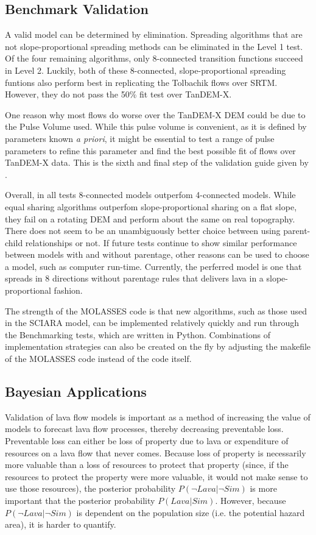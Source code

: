 \documentclass[12pt,letter]{article}
\begin{document}
	\subsection{Benchmark Validation}
	A valid model can be determined by elimination. Spreading algorithms that are not slope-proportional spreading methods can be eliminated in the Level 1 test. Of the four remaining algorithms, only 8-connected transition functions succeed in Level 2. Luckily, both of these 8-connected, slope-proportional spreading funtions also perform best in replicating the Tolbachik flows over SRTM. However, they do not pass the 50\% fit test over TanDEM-X.
	
	One reason why most flows do worse over the TanDEM-X DEM could be due to the Pulse Volume used. While this pulse volume is convenient, as it is defined by parameters known \textit{a priori}, it might be essential to test a range of pulse parameters to refine this parameter and find the best possible fit of flows over TanDEM-X data. This is the sixth and final step of the validation guide given by \citet{bayarri2007framework}.
	
	Overall, in all tests 8-connected models outperfom 4-connected models. While equal sharing algorithms outperfom slope-proportional sharing on a flat slope, they fail on a rotating DEM and perform about the same on real topography. There does not seem to be an unambiguously better choice between using parent-child relationships or not. If future tests continue to show similar performance between models with and without parentage, other reasons can be used to choose a model, such as computer run-time. Currently, the perferred model is one that spreads in 8 directions without parentage rules that delivers lava in a slope-proportional fashion.
	
	The strength of the MOLASSES code is that new algorithms, such as those used in the SCIARA model, can be implemented relatively quickly and run through the Benchmarking tests, which are written in Python. Combinations of implementation strategies can also be created on the fly by adjusting the makefile of the MOLASSES code instead of the code itself.

	\subsection{Bayesian Applications}
		Validation of lava flow models is important as a method of increasing the value of models to forecast lava flow processes, thereby decreasing preventable loss. Preventable loss can either be loss of property due to lava or expenditure of resources on a lava flow that never comes. Because loss of property is necessarily more valuable than a loss of resources to protect that property (since, if the resources to protect the property were more valuable, it would not make sense to use those resources), the posterior probability $P(\neg Lava|\neg Sim)$ is more important that the posterior probability $P(Lava|Sim)$. However, because $P(\neg Lava|\neg Sim)$ is dependent on the population size (i.e. the potential hazard area), it is harder to quantify.
\end{document}
